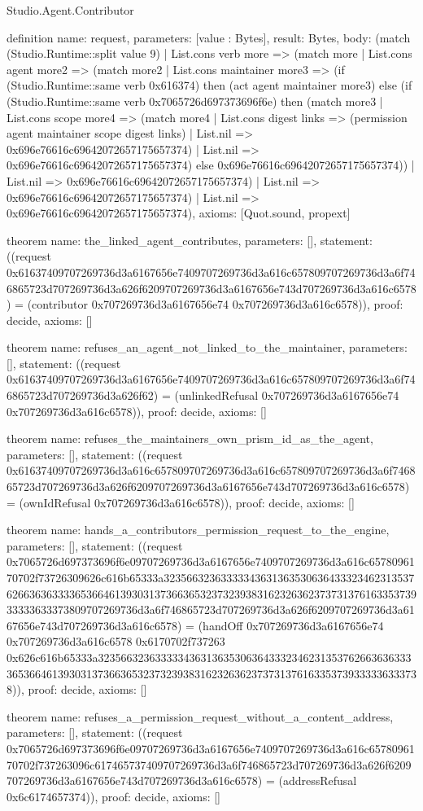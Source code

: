\begin{lexlean}{Studio.Agent.Contributor}
\begin{semanticmodule}
definition{
  name: request,
  parameters: [value : Bytes],
  result: Bytes,
  body: (match (Studio.Runtime::split value 9)
    | List.cons verb more => (match more
      | List.cons agent more2 => (match more2
        | List.cons maintainer more3 => (if (Studio.Runtime::same verb 0x616374) then (act agent maintainer more3) else (if (Studio.Runtime::same verb 0x7065726d697373696f6e) then (match more3
          | List.cons scope more4 => (match more4
            | List.cons digest links => (permission agent maintainer scope digest links)
            | List.nil => 0x696e76616c69642072657175657374)
          | List.nil => 0x696e76616c69642072657175657374) else 0x696e76616c69642072657175657374))
        | List.nil => 0x696e76616c69642072657175657374)
      | List.nil => 0x696e76616c69642072657175657374)
    | List.nil => 0x696e76616c69642072657175657374),
  axioms: [Quot.sound, propext]
}

theorem{
  name: the_linked_agent_contributes,
  parameters: [],
  statement: ((request 0x61637409707269736d3a6167656e7409707269736d3a616c657809707269736d3a6f746865723d707269736d3a626f6209707269736d3a6167656e743d707269736d3a616c6578) = (contributor 0x707269736d3a6167656e74 0x707269736d3a616c6578)),
  proof: decide{},
  axioms: []
}

theorem{
  name: refuses_an_agent_not_linked_to_the_maintainer,
  parameters: [],
  statement: ((request 0x61637409707269736d3a6167656e7409707269736d3a616c657809707269736d3a6f746865723d707269736d3a626f62) = (unlinkedRefusal 0x707269736d3a6167656e74 0x707269736d3a616c6578)),
  proof: decide{},
  axioms: []
}

theorem{
  name: refuses_the_maintainers_own_prism_id_as_the_agent,
  parameters: [],
  statement: ((request 0x61637409707269736d3a616c657809707269736d3a616c657809707269736d3a6f746865723d707269736d3a626f6209707269736d3a6167656e743d707269736d3a616c6578) = (ownIdRefusal 0x707269736d3a616c6578)),
  proof: decide{},
  axioms: []
}

theorem{
  name: hands_a_contributors_permission_request_to_the_engine,
  parameters: [],
  statement: ((request 0x7065726d697373696f6e09707269736d3a6167656e7409707269736d3a616c6578096170702f73726309626c616b65333a3235663236333334363136353063643332346231353762663636333365366461393031373663653237323938316232636237373137616335373933333633373809707269736d3a6f746865723d707269736d3a626f6209707269736d3a6167656e743d707269736d3a616c6578) = (handOff 0x707269736d3a6167656e74 0x707269736d3a616c6578 0x6170702f737263 0x626c616b65333a32356632363333343631363530636433323462313537626636363333653664613930313736636532373239383162326362373731376163353739333336333738)),
  proof: decide{},
  axioms: []
}

theorem{
  name: refuses_a_permission_request_without_a_content_address,
  parameters: [],
  statement: ((request 0x7065726d697373696f6e09707269736d3a6167656e7409707269736d3a616c6578096170702f737263096c617465737409707269736d3a6f746865723d707269736d3a626f6209707269736d3a6167656e743d707269736d3a616c6578) = (addressRefusal 0x6c6174657374)),
  proof: decide{},
  axioms: []
}
\end{semanticmodule}
\end{lexlean}
